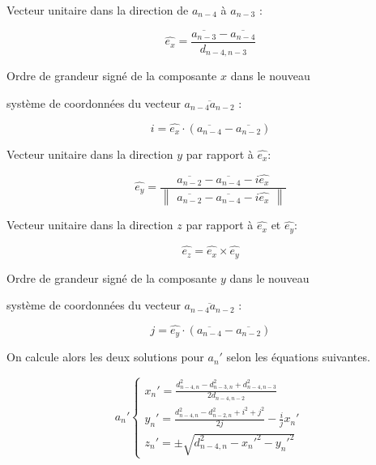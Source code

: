 \vspace{0.4cm}

\centerline{Vecteur unitaire dans la direction de $a_{n-4}$ à $a_{n-3}$ :}

\[
\hat{e_x} = \frac{\overline{a_{n-3}}-\overline{a_{n-4}}}{d_{n-4,n-3}}
\]

\vspace{0.4cm}

\centerline{Ordre de grandeur signé de la composante $x$ dans le nouveau}
\centerline{ système de coordonnées du vecteur $\overline{a_{n-4}a_{n-2}}$ : }
\[
i = \hat{e_x}\cdot(\overline{a_{n-4}}-\overline{a_{n-2}})
\]

\vspace{0.4cm}

\centerline{Vecteur unitaire dans la direction $y$ par rapport à $\hat{e_x}$:}
\[
\hat{e_y} = \frac{\overline{a_{n-2}}-\overline{a_{n-4}}-i\hat{e_x}}{\begin{Vmatrix}\overline{a_{n-2}}-\overline{a_{n-4}}-i\hat{e_x}\end{Vmatrix}}
\]

\vspace{0.4cm}

\centerline{Vecteur unitaire dans la direction $z$ par rapport à $\hat{e_x}$ et $\hat{e_y}$:}
\[
\hat{e_z} = \hat{e_x}\times\hat{e_y}
\]

\vspace{0.4cm}

\centerline{Ordre de grandeur signé de la composante $y$ dans le nouveau}
\centerline{ système de coordonnées du vecteur $\overline{a_{n-4}a_{n-2}}$ : }
\[
j = \hat{e_y}\cdot(\overline{a_{n-4}}-\overline{a_{n-2}})
\]

\vspace{0.4cm}
\par On calcule alors les deux solutions pour $a_n'$ selon les équations suivantes.

\vspace{0.4cm}

\[
a_{n}'\left \{
   	\begin{array}{l}
      x_{n}'= \frac{d_{n-4,n}^2 - d_{n-3,n}^2 + d_{n-4,n-3}^2}{2d_{n-4,n-2}}\\
      y_{n}'= \frac{d_{n-4,n}^2 - d_{n-2,n}^2 + i^2 + j^2}{2j}-\frac{i}{j}x_{n}'\\
	  z_{n}'= \pm\sqrt{d_{n-4,n}^2 - x_{n}'^2 - y_{n}'^2}
   	\end{array}
   	\right .
   	\:
\]

\vspace{0.4cm}

